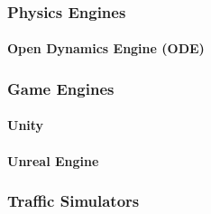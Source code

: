 \subsubsection{Physics Engines}

\paragraph{Open Dynamics Engine (ODE)}


\subsubsection{Game Engines}

\paragraph{Unity}

\paragraph{Unreal Engine}


\subsubsection{Traffic Simulators}